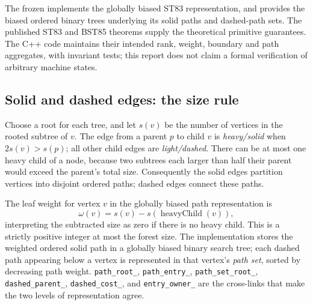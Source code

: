 The frozen  implements the globally biased ST83 representation, and  provides the biased ordered binary trees underlying its solid paths and dashed-path sets.  The published ST83 and BST85 theorems supply the theoretical primitive guarantees.  The C++ code maintains their intended rank, weight, boundary and path aggregates, with invariant tests; this report does not claim a formal verification of arbitrary machine states.

\subsection{Solid and dashed edges: the size rule}
Choose a root for each tree, and let \(s(v)\) be the number of vertices in the rooted subtree of \(v\).  The edge from a parent \(p\) to child \(v\) is \emph{heavy/solid} when \(2s(v)>s(p)\); all other child edges are \emph{light/dashed}.  There can be at most one heavy child of a node, because two subtrees each larger than half their parent would exceed the parent's total size.  Consequently the solid edges partition vertices into disjoint ordered paths; dashed edges connect these paths.

The leaf weight for vertex \(v\) in the globally biased path representation is
\[
\omega(v)=s(v)-s(\operatorname{heavyChild}(v)),
\]
interpreting the subtracted size as zero if there is no heavy child.  This is a strictly positive integer at most the forest size.  The implementation stores the weighted ordered solid path in a globally biased binary search tree; each dashed path appearing below a vertex is represented in that vertex's \emph{path set}, sorted by decreasing path weight.  \texttt{path\_root\_}, \texttt{path\_entry\_}, \texttt{path\_set\_root\_}, \texttt{dashed\_parent\_}, \texttt{dashed\_cost\_}, and \texttt{entry\_owner\_} are the cross-links that make the two levels of representation agree.

